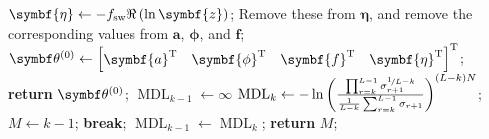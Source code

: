 \begin{algorithm}
\begin{algorithmic}[1]
            \State $\symbf{\eta} \gets -\fsw \Re \left( \ln \symbf{z} \right)$;
                \State Remove these from $\symbf{\eta}$, and remove the
                corresponding values from
                $\symbf{a}$, $\symbf{\phi}$, and $\symbf{f}$;
            \EndIf
            \State $\bthzero \gets
                \begin{bmatrix}
                    \symbf{a}\T &
                    \symbf{\phi}\T &
                    \symbf{f}\T &
                    \symbf{\eta}\T
                \end{bmatrix}\T
            $;
            \State \textbf{return} $\bthzero$;
        \EndProcedure
        \Statex
            \State $\operatorname{MDL}_{k-1} \gets \infty$
                    \State $\operatorname{MDL}_k \gets
                    -\ln\left(
                        \frac
                        {\prod_{r=k}^{L-1} \sigma_{r+1}^{\nicefrac{1}{L-k}}}
                        {\frac{1}{L-k} \sum_{r=k}^{L-1} \sigma_{r+1}}
                    \right)^{(L-k)N}$;
                        \State $M \gets k-1$;
                        \State \textbf{break};
                        \Else\State$\operatorname{MDL}_{k-1} \gets \operatorname{MDL}_k$;
                    \EndIf
                \EndFor
                \State \textbf{return} $M$;
        \EndProcedure
    \end{algorithmic}
\end{algorithm}


